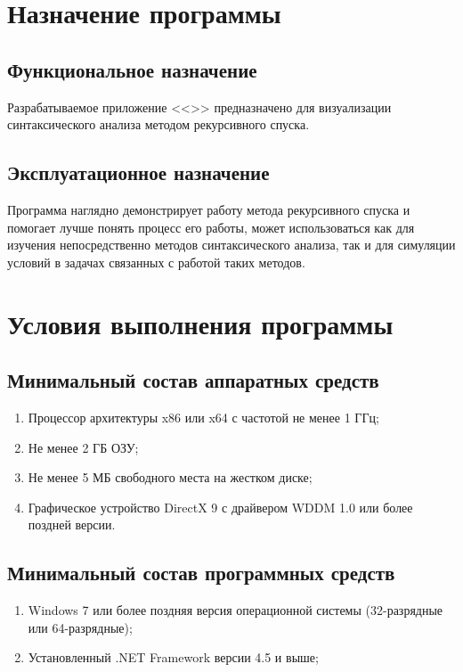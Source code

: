 \documentclass[a4paper,12pt]{article}
\begin{document}
  \CRTpreamble

  \section{Назначение программы}
  \subsection{Функциональное назначение}
  Разрабатываемое приложение <<\CRTname>> предназначено для визуализации синтаксического анализа методом рекурсивного спуска.

  \subsection{Эксплуатационное назначение}
  Программа наглядно демонстрирует работу метода рекурсивного спуска и помогает лучше понять процесс его работы,
  может использоваться как для изучения непосредственно методов синтаксического анализа,
  так и для симуляции условий в задачах связанных с работой таких методов.

  \newpage
  \section{Условия выполнения программы}
  \subsection{Минимальный состав аппаратных средств}
  \begin{enumerate}
    \item Процессор архитектуры x86 или x64 с частотой не менее 1 ГГц;
    \item Не менее 2 ГБ ОЗУ;
    \item Не менее 5 МБ свободного места на жестком диске;
    \item Графическое устройство DirectX 9 с драйвером WDDM 1.0 или более поздней версии.
  \end{enumerate}

  \subsection{Минимальный состав программных средств}
  \begin{enumerate}
    \item Windows 7 или более поздняя версия операционной системы (32-разрядные или 64-разрядные);
    \item Установленный .NET Framework версии 4.5 и выше;
  \end{enumerate}
\end{document}
